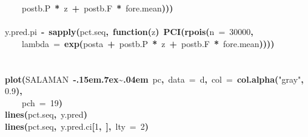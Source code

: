 \documentclass{article}
\makeatletter
\newcommand{\hlnumber}[1]{\textcolor[rgb]{0,0,0}{#1}}%
\newcommand{\hlfunctioncall}[1]{\textcolor[rgb]{.5,0,.33}{\textbf{#1}}}%
\newcommand{\hlstring}[1]{\textcolor[rgb]{.6,.6,1}{#1}}%
\newcommand{\hlkeyword}[1]{\textbf{#1}}%
\newcommand{\hlargument}[1]{\textcolor[rgb]{.69,.25,.02}{#1}}%
\newcommand{\hlformalargs}[1]{\hlargument{#1}}%
\newcommand{\hlassignement}[1]{\textbf{#1}}%
\newcommand{\hlsymbol}[1]{#1}%
\def\urltilda{\kern -.15em\lower .7ex\hbox{\~{}}\kern .04em}%
\newcommand{\hlstd}[1]{\textcolor[rgb]{0,0,0}{#1}}%
\newenvironment{kframe}{%
 \def\FrameCommand##1{\hskip\@totalleftmargin \hskip-\fboxsep
 \colorbox{shadecolor}{##1}\hskip-\fboxsep
     \hskip-\linewidth \hskip-\@totalleftmargin \hskip\columnwidth}%
 \MakeFramed {\advance\hsize-\width
   \@totalleftmargin\z@ \linewidth\hsize
   \@setminipage}}%
 {\par\unskip\endMakeFramed}
\newenvironment{knitrout}{}{} %
\makeatother
\begin{document}
\begin{knitrout}
{\begin{kframe}
\begin{flushleft}
\hlstd{}{\ }{\ }{\ }{\ }\hlsymbol{post}\hlkeyword{\usebox{\hlnormalsizeboxdollar}}\hlsymbol{b.P}{\ }\hlkeyword{*}{\ }\hlsymbol{z}{\ }\hlkeyword{+}{\ }\hlsymbol{post}\hlkeyword{\usebox{\hlnormalsizeboxdollar}}\hlsymbol{b.F}{\ }\hlkeyword{*}{\ }\hlsymbol{fore.mean}\hlkeyword{)}\hlkeyword{)}\hlkeyword{)}\hspace*{\fill}\\
\hlstd{}\hspace*{\fill}\\
\hlstd{}\hlsymbol{y.pred.pi}{\ }\hlassignement{\usebox{\hlnormalsizeboxlessthan}-}{\ }\hlfunctioncall{sapply}\hlkeyword{(}\hlsymbol{pct.seq}\hlkeyword{,}{\ }\hlkeyword{function}\hlkeyword{(}\hlformalargs{z}\hlkeyword{)}{\ }\hlfunctioncall{PCI}\hlkeyword{(}\hlfunctioncall{rpois}\hlkeyword{(}\hlargument{n}{\ }\hlargument{=}{\ }\hlnumber{30000}\hlkeyword{,}\hspace*{\fill}\\
\hlstd{}{\ }{\ }{\ }{\ }\hlargument{lambda}{\ }\hlargument{=}{\ }\hlfunctioncall{exp}\hlkeyword{(}\hlsymbol{post}\hlkeyword{\usebox{\hlnormalsizeboxdollar}}\hlsymbol{a}{\ }\hlkeyword{+}{\ }\hlsymbol{post}\hlkeyword{\usebox{\hlnormalsizeboxdollar}}\hlsymbol{b.P}{\ }\hlkeyword{*}{\ }\hlsymbol{z}{\ }\hlkeyword{+}{\ }\hlsymbol{post}\hlkeyword{\usebox{\hlnormalsizeboxdollar}}\hlsymbol{b.F}{\ }\hlkeyword{*}{\ }\hlsymbol{fore.mean}\hlkeyword{)}\hlkeyword{)}\hlkeyword{)}\hlkeyword{)}\hspace*{\fill}\\
\hlstd{}\hspace*{\fill}\\
\hlstd{}\hspace*{\fill}\\
\hlstd{}\hlfunctioncall{plot}\hlkeyword{(}\hlsymbol{SALAMAN}{\ }\hlkeyword{\urltilda{}}{\ }\hlsymbol{pc}\hlkeyword{,}{\ }\hlargument{data}{\ }\hlargument{=}{\ }\hlsymbol{d}\hlkeyword{,}{\ }\hlargument{col}{\ }\hlargument{=}{\ }\hlfunctioncall{col.alpha}\hlkeyword{(}\hlstring{"gray"}\hlkeyword{,}{\ }\hlnumber{0.9}\hlkeyword{)}\hlkeyword{,}\hspace*{\fill}\\
\hlstd{}{\ }{\ }{\ }{\ }\hlargument{pch}{\ }\hlargument{=}{\ }\hlnumber{19}\hlkeyword{)}\hspace*{\fill}\\
\hlstd{}\hlfunctioncall{lines}\hlkeyword{(}\hlsymbol{pct.seq}\hlkeyword{,}{\ }\hlsymbol{y.pred}\hlkeyword{)}\hspace*{\fill}\\
\hlstd{}\hlfunctioncall{lines}\hlkeyword{(}\hlsymbol{pct.seq}\hlkeyword{,}{\ }\hlsymbol{y.pred.ci}\hlkeyword{[}\hlnumber{1}\hlkeyword{,}{\ }\hlkeyword{]}\hlkeyword{,}{\ }\hlargument{lty}{\ }\hlargument{=}{\ }\hlnumber{2}\hlkeyword{)}\hspace*{\fill}\\

\end{flushleft}
\end{kframe}}
\end{knitrout}
\end{document}
